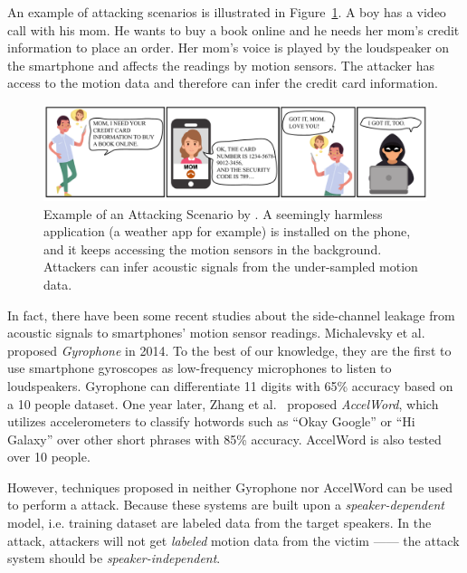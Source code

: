 An example of attacking scenarios is illustrated in  Figure~\ref{fig:teaserpic}. A boy has a video call with his mom. He wants to buy a book online and he needs her mom’s credit information to place an order. Her mom’s voice is played by the loudspeaker on the smartphone and affects the readings by motion sensors. The attacker has access to the motion data and therefore can infer the credit card information.  
%

\begin{figure}
	\centering
	\includegraphics[width=\linewidth]{Figures/SpyPhone/teaserpic}
	\caption[Example of an Attacking Scenario.]{Example of an Attacking Scenario by {\spp}. A seemingly harmless application (a weather app for example) is installed on the phone, and it keeps accessing the motion sensors in the background. Attackers can infer acoustic signals from the under-sampled motion data. }
	\label{fig:teaserpic}
\end{figure}



In fact, there have been some recent studies about the side-channel leakage from acoustic signals to smartphones' motion sensor readings. Michalevsky et al.~\cite{michalevsky2014gyrophone} proposed \textit{Gyrophone} in 2014. To the best of our knowledge, they are the first to use smartphone gyroscopes as low-frequency microphones to listen to loudspeakers. Gyrophone can differentiate 11 digits with 65\% accuracy based on a 10 people dataset.
One year later, Zhang et al.~\cite{zhang2015accelword} proposed \textit{AccelWord}, which utilizes accelerometers to classify hotwords such as ``Okay Google'' or ``Hi Galaxy'' over other short phrases with 85\% accuracy. AccelWord is also tested over 10 people.


However, techniques proposed in neither Gyrophone nor AccelWord can be used to perform a {\attackName} attack. Because these systems are built upon a \textit{speaker-dependent} model, i.e. training dataset are labeled data from the target speakers. In the {\attackName} attack, attackers will not get \textit{labeled} motion data from the victim  ------ the attack system should be \textit{speaker-independent}.

